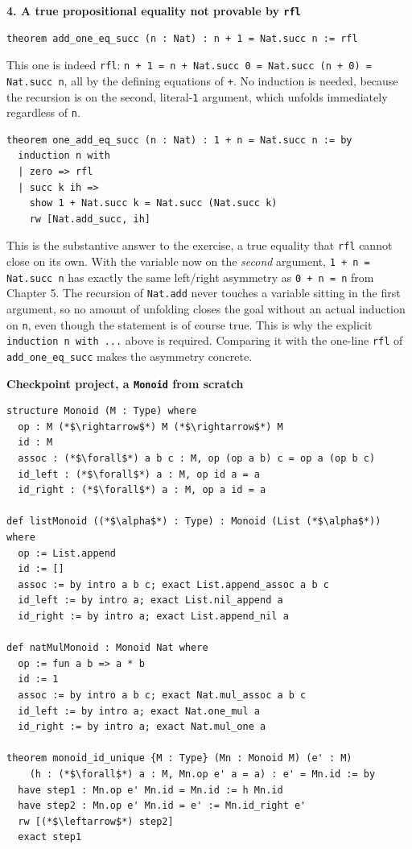 \textbf{4. A true propositional equality not provable by \texttt{rfl}}

\begin{lstlisting}
theorem add_one_eq_succ (n : Nat) : n + 1 = Nat.succ n := rfl
\end{lstlisting}

This one is indeed \texttt{rfl}: \texttt{n + 1 = n + Nat.succ 0 = Nat.succ (n + 0) = Nat.succ n}, all by the defining equations of \texttt{+}. No induction is needed, because the recursion is on the second, literal-\texttt{1} argument, which unfolds immediately regardless of \texttt{n}.

\begin{lstlisting}
theorem one_add_eq_succ (n : Nat) : 1 + n = Nat.succ n := by
  induction n with
  | zero => rfl
  | succ k ih =>
    show 1 + Nat.succ k = Nat.succ (Nat.succ k)
    rw [Nat.add_succ, ih]
\end{lstlisting}

This is the substantive answer to the exercise, a true equality that \texttt{rfl} cannot close on its own. With the variable now on the \emph{second} argument, \texttt{1 + n = Nat.succ n} has exactly the same left/right asymmetry as \texttt{0 + n = n} from Chapter 5. The recursion of \texttt{Nat.add} never touches a variable sitting in the first argument, so no amount of unfolding closes the goal without an actual induction on \texttt{n}, even though the statement is of course true. This is why the explicit \texttt{induction n with ...} above is required. Comparing it with the one-line \texttt{rfl} of \texttt{add\_\allowbreak{}one\_\allowbreak{}eq\_\allowbreak{}succ} makes the asymmetry concrete.

\textbf{Checkpoint project, a \texttt{Monoid} from scratch}

\begin{lstlisting}
structure Monoid (M : Type) where
  op : M (*$\rightarrow$*) M (*$\rightarrow$*) M
  id : M
  assoc : (*$\forall$*) a b c : M, op (op a b) c = op a (op b c)
  id_left : (*$\forall$*) a : M, op id a = a
  id_right : (*$\forall$*) a : M, op a id = a

def listMonoid ((*$\alpha$*) : Type) : Monoid (List (*$\alpha$*)) where
  op := List.append
  id := []
  assoc := by intro a b c; exact List.append_assoc a b c
  id_left := by intro a; exact List.nil_append a
  id_right := by intro a; exact List.append_nil a

def natMulMonoid : Monoid Nat where
  op := fun a b => a * b
  id := 1
  assoc := by intro a b c; exact Nat.mul_assoc a b c
  id_left := by intro a; exact Nat.one_mul a
  id_right := by intro a; exact Nat.mul_one a

theorem monoid_id_unique {M : Type} (Mn : Monoid M) (e' : M)
    (h : (*$\forall$*) a : M, Mn.op e' a = a) : e' = Mn.id := by
  have step1 : Mn.op e' Mn.id = Mn.id := h Mn.id
  have step2 : Mn.op e' Mn.id = e' := Mn.id_right e'
  rw [(*$\leftarrow$*) step2]
  exact step1
\end{lstlisting}

